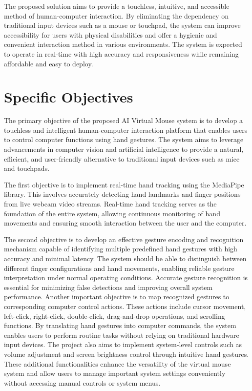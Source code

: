 \documentclass[12pt,a4paper]{report}
\begin{document}
The proposed solution aims to provide a touchless, intuitive, and accessible method of human-computer interaction. By eliminating the dependency on traditional input devices such as a mouse or touchpad, the system can improve accessibility for users with physical disabilities and offer a hygienic and convenient interaction method in various environments. The system is expected to operate in real-time with high accuracy and responsiveness while remaining affordable and easy to deploy.

\section{Specific Objectives}



\begin{enumerate}



The primary objective of the proposed AI Virtual Mouse system is to develop a touchless and intelligent human-computer interaction platform that enables users to control computer functions using hand gestures. The system aims to leverage advancements in computer vision and artificial intelligence to provide a natural, efficient, and user-friendly alternative to traditional input devices such as mice and touchpads.
\newline

The first objective is to implement real-time hand tracking using the MediaPipe library. This involves accurately detecting hand landmarks and finger positions from live webcam video streams. Real-time hand tracking serves as the foundation of the entire system, allowing continuous monitoring of hand movements and ensuring smooth interaction between the user and the computer.
\newline

The second objective is to develop an effective gesture encoding and recognition mechanism capable of identifying multiple predefined hand gestures with high accuracy and minimal latency. The system should be able to distinguish between different finger configurations and hand movements, enabling reliable gesture interpretation under normal operating conditions. Accurate gesture recognition is essential for minimizing false detections and improving overall system performance.
\newline
Another important objective is to map recognized gestures to corresponding computer control actions. These actions include cursor movement, left-click, right-click, double-click, drag-and-drop operations, and scrolling functions. By translating hand gestures into computer commands, the system enables users to perform routine tasks without relying on traditional hardware input devices.
\newline
The project also aims to implement system-level controls such as volume adjustment and screen brightness control through intuitive hand gestures. These additional functionalities enhance the versatility of the virtual mouse system and allow users to manage important system settings conveniently without accessing manual controls or system menus.



\end{enumerate}
\end{document}

